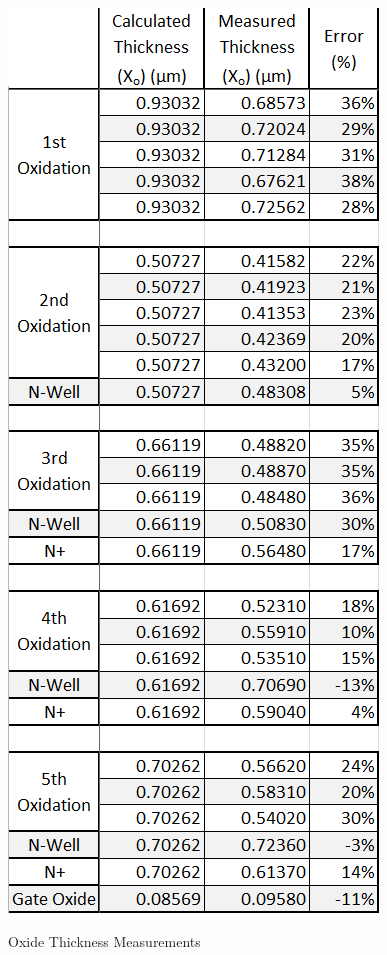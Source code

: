 \documentclass[letter,12pt]{article}
\begin{document}
		\begin{table}[]
			\centering
			\includegraphics[scale=.75]{./Images/Oxide_Thickness_Measurements.png}
			\caption{Oxide Thickness Measurements}
			\label{tab:Oxide_Measurements}
		\end{table}
	
	\FloatBarrier
\end{document}
